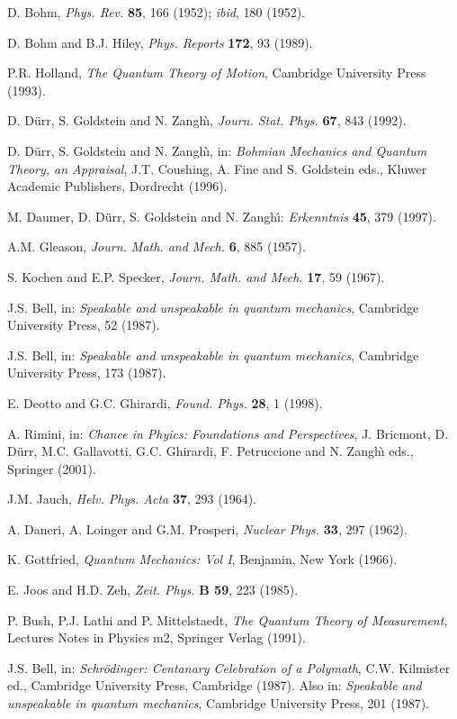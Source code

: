 \documentclass[12pt]{article}
\begin{document}
\begin{thebibliography}{999}
 D. Bohm, {\it Phys. Rev.} {\bf 85}, 166 (1952); {\it
ibid}, 180 (1952).

 D. Bohm and B.J. Hiley, {\it Phys. Reports} {\bf 172},
93 (1989).

 P.R. Holland, {\it The Quantum Theory of Motion},
Cambridge University Press (1993).

 D. D\"urr, S. Goldstein and N. Zangh\`{\i}, {\it
Journ. Stat. Phys.} {\bf 67}, 843 (1992).

 D. D\"urr, S. Goldstein and N. Zangh\`{\i}, in:
{\it Bohmian Mechanics and Quantum Theory, an Appraisal}, J.T.
Coushing, A. Fine and S. Goldstein eds., Kluwer Academic
Publishers, Dordrecht (1996).

 M. Daumer, D. D\"{u}rr, S. Goldstein  and N.
Zangh\'{\i}: {\it Erkenntnis} {\bf 45}, 379 (1997).

 A.M. Gleason, {\it Journ. Math. and Mech.} {\bf 6}, 885
(1957).

 S. Kochen and E.P. Specker, {\it Journ. Math. and
Mech.} {\bf 17}, 59 (1967).

 J.S. Bell, in: {\it Speakable and unspeakable in
quantum mechanics}, Cambridge University Press, 52 (1987).

 J.S. Bell, in: {\it Speakable and unspeakable in
quantum mechanics}, Cambridge University Press, 173 (1987).

 E. Deotto and G.C. Ghirardi, {\it Found. Phys.} {\bf
28}, 1 (1998).

 A. Rimini, in: {\it Chance in Phyics: Foundations
and Perspectives}, J. Bricmont, D. D\"urr, M.C. Gallavotti, G.C.
Ghirardi, F. Petruccione and N. Zangh\`{\i} eds., Springer (2001).

 J.M. Jauch, {\it Helv. Phys. Acta} {\bf 37}, 293
(1964).

 A. Daneri, A. Loinger and G.M. Prosperi, {\it
Nuclear Phys.} {\bf 33}, 297 (1962).

 K. Gottfried, {\it Quantum Mechanics: Vol I},
Benjamin, New York (1966).

 E. Joos and H.D. Zeh, {\it Zeit. Phys.} {\bf B 59},
223 (1985).

 P. Bush, P.J. Lathi and P. Mittelstaedt, {\it The
Quantum Theory of Measurement}, Lectures Notes in Physics m2,
Springer Verlag (1991).

 J.S. Bell, in: {\it Schr\"odinger: Centanary
Celebration of a Polymath}, C.W. Kilmister ed., Cambridge
University Press, Cambridge (1987). Also in: {\it Speakable and
unspeakable in quantum mechanics}, Cambridge University Press, 201
(1987).


\end{thebibliography}
\end{document}
